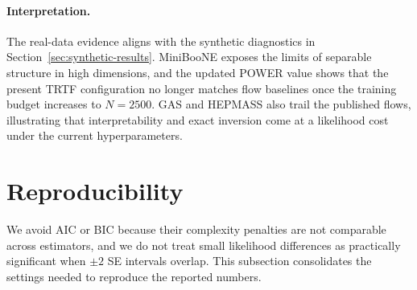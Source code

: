 \documentclass[11pt,a4paper,twoside]{book}\usepackage[]{graphicx}\usepackage[]{xcolor}
\begin{document}
\paragraph{Interpretation.} The real-data evidence aligns with the synthetic diagnostics in Section~\ref{sec:synthetic-results}. MiniBooNE exposes the limits of separable structure in high dimensions, and the updated POWER value shows that the present TRTF configuration no longer matches flow baselines once the training budget increases to $N=2500$. GAS and HEPMASS also trail the published flows, illustrating that interpretability and exact inversion come at a likelihood cost under the current hyperparameters.

\section{Reproducibility}\label{sec:reproducibility}
We avoid AIC or BIC because their complexity penalties are not comparable across estimators, and we do not treat small likelihood differences as practically significant when $\pm 2$ SE intervals overlap. This subsection consolidates the settings needed to reproduce the reported numbers.
\end{document}
